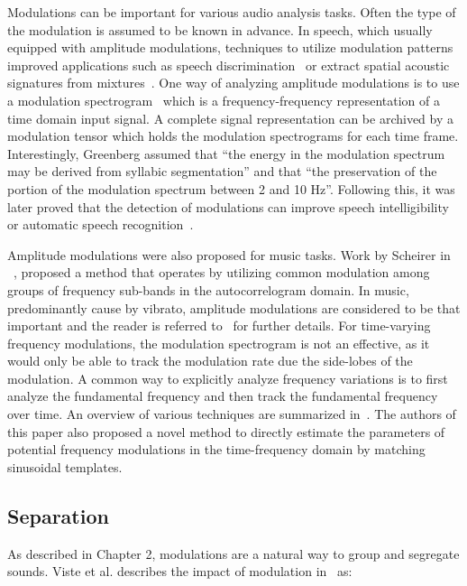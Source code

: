 Modulations can be important for various audio analysis tasks.
Often the type of the modulation is assumed to be known in advance.
In speech, which usually equipped with amplitude modulations, techniques to utilize modulation patterns improved applications such as speech discrimination~\cite{mesgarani04} or extract spatial acoustic signatures from mixtures~\cite{sukittanon06}.
One way of analyzing amplitude modulations is to use a modulation spectrogram~\cite{greenberg97} which is a frequency-frequency representation of a time domain input signal.
A complete signal representation can be archived by a modulation tensor which holds the modulation spectrograms for each time frame.
Interestingly, Greenberg assumed that ``the energy in the modulation spectrum may be derived from syllabic segmentation'' and that ``the preservation of the portion of the modulation spectrum between 2 and 10 Hz''.
Following this, it was later proved that the detection of modulations can improve speech intelligibility~\cite{elhilali03} or automatic speech recognition~\cite{kingsbury98}.
\par
Amplitude modulations were also proposed for music tasks. 
Work by Scheirer in ~\cite{scheirer99}, proposed a method that operates by utilizing common modulation among groups of frequency sub-bands in the autocorrelogram domain.
In music, predominantly cause by vibrato, amplitude modulations are considered to be that important and the reader is referred to~\cite{muller11} for further details.
For time-varying frequency modulations, the modulation spectrogram is not an effective, as it would only be able to track the modulation rate due the side-lobes of the modulation.
A common way to explicitly analyze frequency variations is to first analyze the fundamental frequency and then track the fundamental frequency over time. 
An overview of various techniques are summarized in~\cite{driedger16}.
The authors of this paper also proposed a novel method to directly estimate the parameters of potential frequency modulations in the time-frequency domain by matching sinusoidal templates.

\subsection{Separation}

As described in Chapter 2, modulations are a natural way to group and segregate sounds. Viste et al. describes the impact of modulation in~\cite{viste03} as:

